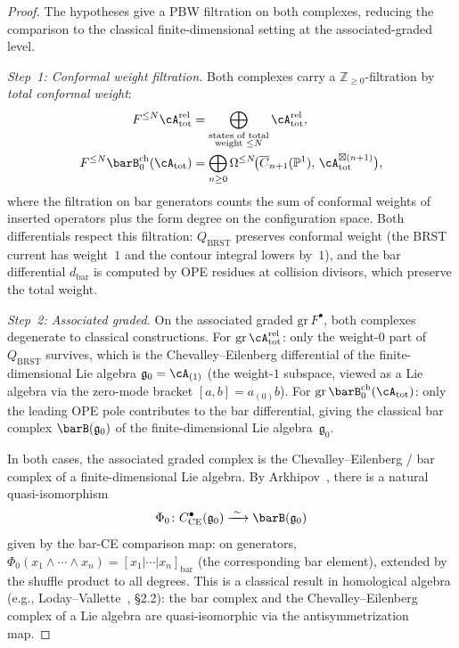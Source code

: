 \begin{proof}
The hypotheses give a PBW filtration on both complexes, reducing the
comparison to the classical finite-dimensional setting at the
associated-graded level.

\emph{Step~1: Conformal weight filtration.}
Both complexes carry a $\mathbb{Z}_{\geq 0}$-filtration by
\emph{total conformal weight}:
\begin{align}
F^{\leq N}\cA_{\mathrm{tot}}^{\mathrm{rel}}
 &= \bigoplus_{\substack{\text{states of total}\\\text{weight } \leq N}}
 \cA_{\mathrm{tot}}^{\mathrm{rel}}, \\
F^{\leq N}\barB^{\mathrm{ch}}_0(\cA_{\mathrm{tot}})
 &= \bigoplus_{\substack{n \geq 0}}
 \Omega^{\leq N}\!\bigl(
 \overline{C}_{n+1}(\mathbb{P}^1),\,
 \cA_{\mathrm{tot}}^{\boxtimes(n+1)}
 \bigr),
\end{align}
where the filtration on bar generators counts the sum of conformal
weights of inserted operators plus the form degree on the
configuration space. Both differentials respect this filtration:
$Q_{\mathrm{BRST}}$ preserves conformal weight (the BRST current
has weight~$1$ and the contour integral lowers by~$1$), and the bar
differential $d_{\mathrm{bar}}$ is computed by OPE residues at
collision divisors, which preserve the total weight.

\emph{Step~2: Associated graded.}
On the associated graded $\mathrm{gr}\,F^{\bullet}$, both complexes
degenerate to classical constructions. For
$\mathrm{gr}\,\cA_{\mathrm{tot}}^{\mathrm{rel}}$: only the
weight-$0$ part of $Q_{\mathrm{BRST}}$ survives, which is the
Chevalley--Eilenberg differential of the finite-dimensional Lie algebra
$\mathfrak{g}_0 = \cA_{(1)}$ (the weight-$1$ subspace, viewed as a Lie
algebra via the zero-mode bracket $[a, b] = a_{(0)} b$).
For $\mathrm{gr}\,\barB^{\mathrm{ch}}_0(\cA_{\mathrm{tot}})$: only
the leading OPE pole contributes to the bar differential, giving
the classical bar complex $\barB(\mathfrak{g}_0)$ of the
finite-dimensional Lie algebra~$\mathfrak{g}_0$.

In both cases, the associated graded complex is the
Chevalley--Eilenberg / bar complex of a finite-dimensional Lie algebra.
By Arkhipov~\cite{Arkhipov97}, there is a natural quasi-isomorphism
\begin{equation}\label{eq:arkhipov-classical}
\Phi_0 \colon C^{\bullet}_{\mathrm{CE}}(\mathfrak{g}_0)
 \xrightarrow{\;\sim\;}
 \barB(\mathfrak{g}_0)
\end{equation}
given by the bar-CE comparison map: on generators,
$\Phi_0(x_1 \wedge \cdots \wedge x_n)
= [x_1 | \cdots | x_n]_{\mathrm{bar}}$
(the corresponding bar element), extended by the shuffle product
to all degrees. This is a classical result in homological algebra
(e.g., Loday--Vallette~\cite{LV12}, \S2.2): the bar complex and
the Chevalley--Eilenberg complex of a Lie algebra are
quasi-isomorphic via the antisymmetrization map.


\end{proof}
